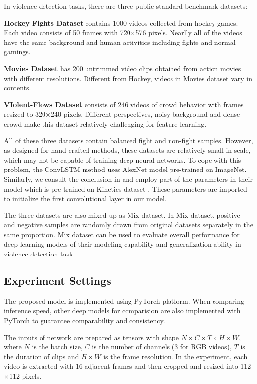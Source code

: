 \documentclass[10pt,twocolumn,letterpaper]{article}
\begin{document}
In violence detection tasks, there are three public standard benchmark datasets:

\textbf{Hockey Fights Dataset} \cite{hockey} contains 1000 videos collected from hockey games.
Each video consists of 50 frames with 720$\times$576 pixels. Nearlly all of the videos have the same background and human activities including fights and normal gamings.

\textbf{Movies Dataset} \cite{hockey} has 200 untrimmed video clips obtained from action movies with different resolutions. Different from Hockey, videos in Movies dataset vary in contents.

\textbf{VIolent-Flows Dataset} \cite{vif} consists of 246 videos of crowd behavior with frames resized to 320$\times$240 pixels.
Different perspectives, noisy background and dense crowd make this dataset relatively challenging for feature learning.

All of these three datasets contain balanced fight and non-fight samples. 
However, as designed for hand-crafted methods, these datasets are relatively small in scale, which may not be capable of training deep neural networks.
To cope with this problem, the ConvLSTM method \cite{convlstm_sudh} uses AlexNet model pre-trained on ImageNet.
Similarly, we consult the conclusion in \cite{3dcnn_2} and employ part of the parameters in their model which is pre-trained on Kinetics dataset \cite{kinetics}.
These parameters are imported to initialize the first convolutional layer in our model.

The three datasets are also mixed up as Mix dataset.
In Mix dataset, positive and negative samples are randomly drawn from original datasets separately in the same proportion.
Mix dataset can be used to evaluate overall performance for deep learning models of their modeling capability and generalization ability in violence detection task.

\subsection{Experiment Settings}

The proposed model is implemented using PyTorch \cite{pytorch} platform. 
When comparing inference speed, other deep models for comparision are also implemented with PyTorch to guarantee comparability and consistency.

The inputs of network are prepared as tensors with shape $N \times C \times T \times H \times W$, where $N$ is the batch size, $C$ is the number of channels (3 for RGB videos), $T$ is the duration of clips and $H \times W$ is the frame resolution. 
In the experiment, each video is extracted with 16 adjacent frames and then cropped and resized into 112$\times$112 pixels.
\end{document}
